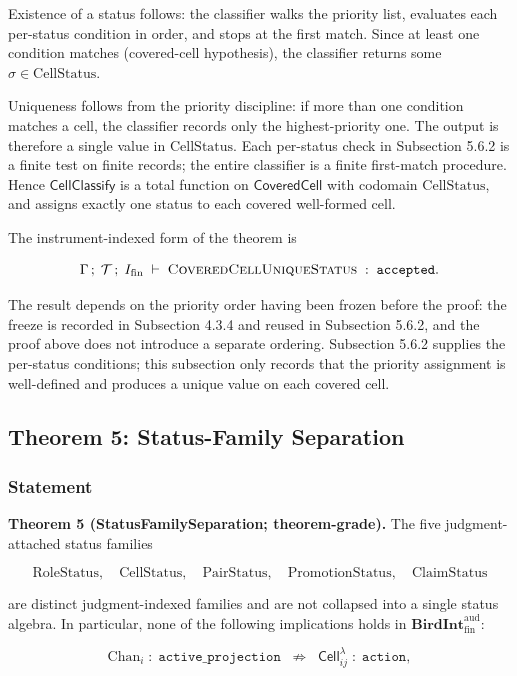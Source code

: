 \documentclass[11pt]{article}
\theoremstyle{definition}
\begin{document}
Existence of a status follows: the classifier walks the priority list, evaluates each per-status condition in order, and stops at the first match. Since at least one condition matches (covered-cell hypothesis), the classifier returns some \(\sigma\in\mathrm{CellStatus}\).

Uniqueness follows from the priority discipline: if more than one condition matches a cell, the classifier records only the highest-priority one. The output is therefore a single value in \(\mathrm{CellStatus}\). Each per-status check in Subsection 5.6.2 is a finite test on finite records; the entire classifier is a finite first-match procedure. Hence \(\mathsf{CellClassify}\) is a total function on \(\mathsf{CoveredCell}\) with codomain \(\mathrm{CellStatus}\), and assigns exactly one status to each covered well-formed cell.

The instrument-indexed form of the theorem is

\[
\Gamma\,;\;\mathcal T\,;\;I_{\mathrm{fin}}\;\vdash\;\textsc{CoveredCellUniqueStatus}\;:\;\texttt{accepted}.
\]

The result depends on the priority order having been frozen before the proof: the freeze is recorded in Subsection 4.3.4 and reused in Subsection 5.6.2, and the proof above does not introduce a separate ordering. Subsection 5.6.2 supplies the per-status conditions; this subsection only records that the priority assignment is well-defined and produces a unique value on each covered cell.

\subsection{Theorem 5: Status-Family Separation}

\subsubsection{Statement}

\textbf{Theorem 5 (StatusFamilySeparation; theorem-grade).} The five judgment-attached status families

\[
\mathrm{RoleStatus},\quad\mathrm{CellStatus},\quad\mathrm{PairStatus},\quad\mathrm{PromotionStatus},\quad\mathrm{ClaimStatus}
\]

are distinct judgment-indexed families and are not collapsed into a single status algebra. In particular, none of the following implications holds in \(\mathbf{BirdInt}^{\mathrm{aud}}_{\mathrm{fin}}\):

\[
\mathrm{Chan}_i\;:\;\texttt{active\_projection}\;\;\not\Rightarrow\;\;\mathsf{Cell}_{ij}^{\lambda}\;:\;\texttt{action},
\]
\end{document}
